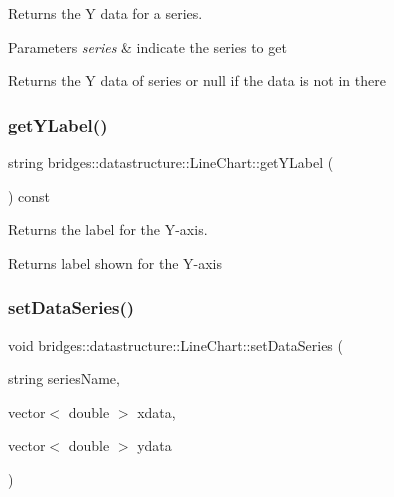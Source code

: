 Returns the Y data for a series. 


\begin{DoxyParams}{Parameters}
{\em series} & indicate the series to get \\
\hline
\end{DoxyParams}
\begin{DoxyReturn}{Returns}
the Y data of series or null if the data is not in there 
\end{DoxyReturn}
\mbox{\label{classbridges_1_1datastructure_1_1_line_chart_a682095169d9a7ce3899f129a13fd9616}} 
\subsubsection{\texorpdfstring{getYLabel()}{getYLabel()}}
{\footnotesize\ttfamily string bridges\+::datastructure\+::\+Line\+Chart\+::get\+Y\+Label (\begin{DoxyParamCaption}{ }\end{DoxyParamCaption}) const\hspace{0.3cm}{\ttfamily [inline]}}



Returns the label for the Y-\/axis. 

\begin{DoxyReturn}{Returns}
label shown for the Y-\/axis 
\end{DoxyReturn}
\mbox{\label{classbridges_1_1datastructure_1_1_line_chart_acb763ea4b2d0f27c73edc3861cc51fbb}} 
\subsubsection{\texorpdfstring{setDataSeries()}{setDataSeries()}}
{\footnotesize\ttfamily void bridges\+::datastructure\+::\+Line\+Chart\+::set\+Data\+Series (\begin{DoxyParamCaption}\item[{string}]{series\+Name,  }\item[{vector$<$ double $>$}]{xdata,  }\item[{vector$<$ double $>$}]{ydata }\end{DoxyParamCaption})\hspace{0.3cm}{\ttfamily [inline]}}



